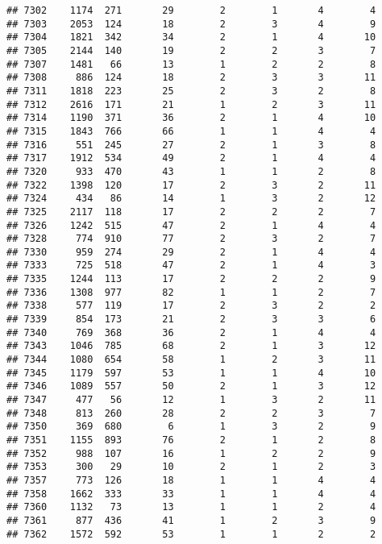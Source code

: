 \documentclass[]{article}
\begin{document}
\begin{verbatim}
## 7302    1174  271       29        2        1       4        4
## 7303    2053  124       18        2        3       4        9
## 7304    1821  342       34        2        1       4       10
## 7305    2144  140       19        2        2       3        7
## 7307    1481   66       13        1        2       2        8
## 7308     886  124       18        2        3       3       11
## 7311    1818  223       25        2        3       2        8
## 7312    2616  171       21        1        2       3       11
## 7314    1190  371       36        2        1       4       10
## 7315    1843  766       66        1        1       4        4
## 7316     551  245       27        2        1       3        8
## 7317    1912  534       49        2        1       4        4
## 7320     933  470       43        1        1       2        8
## 7322    1398  120       17        2        3       2       11
## 7324     434   86       14        1        3       2       12
## 7325    2117  118       17        2        2       2        7
## 7326    1242  515       47        2        1       4        4
## 7328     774  910       77        2        3       2        7
## 7330     959  274       29        2        1       4        4
## 7333     725  518       47        2        1       4        3
## 7335    1244  113       17        2        2       2        9
## 7336    1308  977       82        1        1       2        7
## 7338     577  119       17        2        3       2        2
## 7339     854  173       21        2        3       3        6
## 7340     769  368       36        2        1       4        4
## 7343    1046  785       68        2        1       3       12
## 7344    1080  654       58        1        2       3       11
## 7345    1179  597       53        1        1       4       10
## 7346    1089  557       50        2        1       3       12
## 7347     477   56       12        1        3       2       11
## 7348     813  260       28        2        2       3        7
## 7350     369  680        6        1        3       2        9
## 7351    1155  893       76        2        1       2        8
## 7352     988  107       16        1        2       2        9
## 7353     300   29       10        2        1       2        3
## 7357     773  126       18        1        1       4        4
## 7358    1662  333       33        1        1       4        4
## 7360    1132   73       13        1        1       2        4
## 7361     877  436       41        1        2       3        9
## 7362    1572  592       53        1        1       2        2

\end{verbatim}
\end{document}

